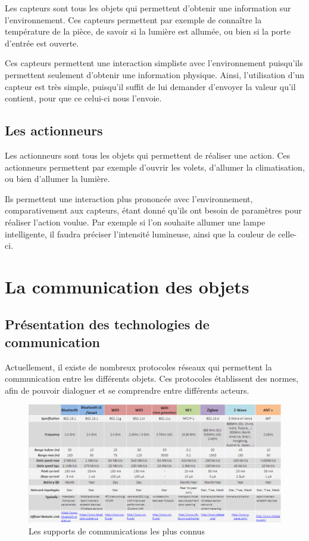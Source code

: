 Les capteurs sont tous les objets qui permettent d'obtenir une information sur l'environnement. Ces capteurs 
permettent par exemple de connaître la température de la pièce, de savoir si la lumière est allumée, ou 
bien si la porte d'entrée est ouverte.

Ces capteurs permettent une interaction simpliste avec l'environnement puisqu'ils permettent seulement 
d'obtenir une information physique. Ainsi, l'utilisation d'un capteur est très simple, puisqu'il suffit de 
lui demander d'envoyer la valeur qu'il contient, pour que ce celui-ci nous l'envoie.
	\subsection{Les actionneurs}
	
Les actionneurs sont tous les objets qui permettent de réaliser une action. Ces actionneurs permettent par 
exemple d'ouvrir les volets, d'allumer la climatisation, ou bien d'allumer la lumière.

Ils permettent une interaction plus prononcée avec l'environnement, comparativement aux capteurs, 
étant donné qu'ils ont besoin de paramètres pour réaliser l'action voulue. Par exemple si l'on 
souhaite allumer une lampe intelligente, il faudra préciser l'intensité lumineuse, ainsi que la 
couleur de celle-ci.

\section{La communication des objets}
	\subsection{Présentation des technologies de communication}
Actuellement, il existe de nombreux protocoles réseaux qui permettent la communication entre les différents objets. Ces protocoles établissent des normes, afin de pouvoir dialoguer et se comprendre entre différents acteurs.

\begin{figure}[!ht]
         \centering
         \includegraphics[width=1.05\textwidth]{img/tableau-total.png}
         \caption{Les supports de communications les plus connus}
         \label{supports}
\end{figure}

